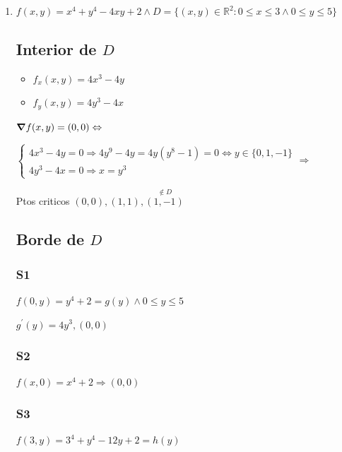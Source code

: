 \documentclass[../practica_06.tex]{subfiles}
\begin{document}
\begin{enumerate}
        \item $f(x,y) = x^4+y^4-4xy+2 \wedge D=\{(x,y)\in \mathbb{R}^2: 0\leq x \leq 3 \wedge 0 \leq y \leq 5\}$

            \subsection*{Interior de $D$}

            \begin{itemize}
                \item $f_x(x,y) = 4x^3 - 4y$
                \item $f_y(x,y) = 4y^3 - 4x$
            \end{itemize}

            $\grad f(x,y) = (0,0) \Leftrightarrow$

            $\left \{\begin{array}{ll}
                4x^3 - 4y = 0 \Rightarrow 4y^9 - 4y = 4y(y^8 - 1) = 0 \Leftrightarrow y \in \{0,1,-1\}\\
                4y^3 - 4x = 0 \Rightarrow x = y^3 
            \end{array} \right. \Rightarrow$

            Ptos criticos $(0,0), (1,1), \stackrel{\notin D}{(1,-1)}$

            \subsection*{Borde de $D$}

            \subsubsection{S1}

            $f(0,y) = y^4 +2 = g(y) \wedge 0 \leq y \leq 5$

            $g^{\prime}(y) = 4y^3, (0,0)$

            \subsubsection{S2}

            $f(x,0) = x^4 +2 \Rightarrow (0,0)$

            \subsubsection{S3}

            $f(3,y) = 3^4 + y^4 - 12y + 2 = h(y)$


\end{enumerate}
\end{document}
